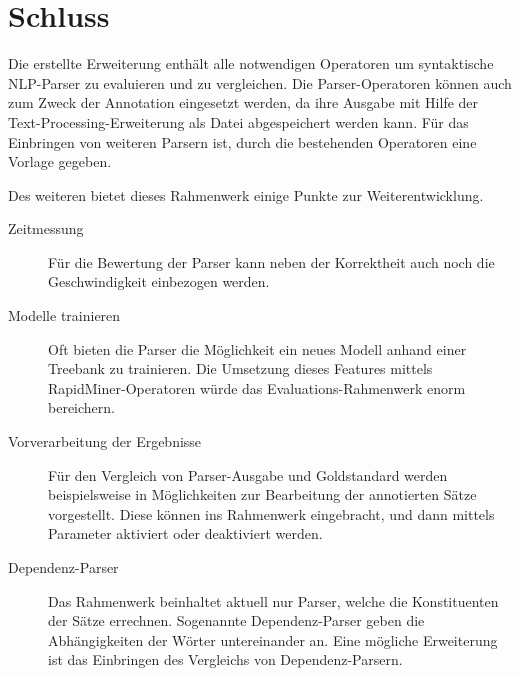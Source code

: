 %
\chapter{Schluss}
\label{sec:schluss}

Die erstellte Erweiterung enthält alle notwendigen Operatoren um syntaktische NLP-Parser zu evaluieren und zu vergleichen. Die Parser-Operatoren können auch zum Zweck der Annotation eingesetzt werden, da ihre Ausgabe mit Hilfe der Text-Processing-Erweiterung als Datei abgespeichert werden kann. Für das Einbringen von weiteren Parsern ist, durch die bestehenden Operatoren eine Vorlage gegeben.

Des weiteren bietet dieses Rahmenwerk einige Punkte zur Weiterentwicklung.
\begin{description}
\item[Zeitmessung]
Für die Bewertung der Parser kann neben der Korrektheit auch noch die Geschwindigkeit einbezogen werden. 
\item[Modelle trainieren]
Oft bieten die Parser die Möglichkeit ein neues Modell anhand einer Treebank zu trainieren. Die Umsetzung dieses Features mittels RapidMiner-Operatoren würde das Evaluations-Rahmenwerk enorm bereichern. 
\item[Vorverarbeitung der Ergebnisse]
Für den Vergleich von Parser-Ausgabe und Goldstandard werden beispielsweise in \cite{parseval} Möglichkeiten zur Bearbeitung der annotierten Sätze vorgestellt. Diese können ins Rahmenwerk eingebracht, und dann mittels Parameter aktiviert oder deaktiviert werden.
\item[Dependenz-Parser]
Das Rahmenwerk beinhaltet aktuell nur Parser, welche die Konstituenten der Sätze errechnen. Sogenannte Dependenz-Parser geben die Abhängigkeiten der Wörter untereinander an. Eine mögliche Erweiterung ist das Einbringen des Vergleichs von Dependenz-Parsern.
\end{description}